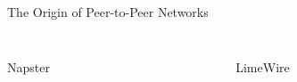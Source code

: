 \documentclass[handout]{beamer}
\begin{document}
\begin{frame}{The Origin of Peer-to-Peer Networks}
\begin{columns}
\begin{column}{0.5\textwidth}
\begin{figure}
\begin{center}
				\end{center}
			\end{figure}
		\end{column}
	\end{columns}
	\begin{columns}
		\begin{column}{0.5\textwidth}
			\begin{center}
				Napster
			\end{center}
		\end{column}
		\begin{column}{0.5\textwidth}
			\begin{center}
				LimeWire
			\end{center}
		\end{column}
	\end{columns}
	\vspace{1.8em}
\end{frame}
\end{document}
